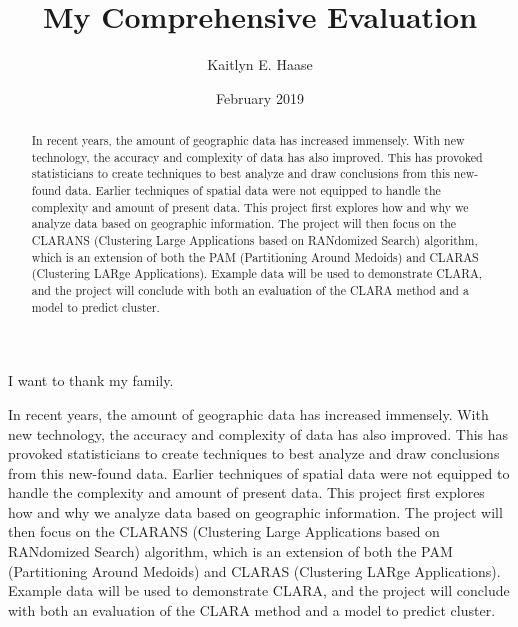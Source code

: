 \documentclass[12pt,twoside]{amherstthesis}
\title{My Comprehensive Evaluation}
\author{Kaitlyn E. Haase}
\date{February 2019}
\begin{document}
      \maketitle
  
  \frontmatter %
  \pagestyle{empty} %

      \begin{acknowledgements}
      I want to thank my family.
    \end{acknowledgements}
  
  

      \hypersetup{linkcolor=black}
    \setcounter{tocdepth}{2}
    \tableofcontents
  
      \listoftables
  
      \listoffigures
  
      \begin{abstract}
      In recent years, the amount of geographic data has increased immensely.
      With new technology, the accuracy and complexity of data has also
      improved. This has provoked statisticians to create techniques to best
      analyze and draw conclusions from this new-found data. Earlier
      techniques of spatial data were not equipped to handle the complexity
      and amount of present data. This project first explores how and why we
      analyze data based on geographic information. The project will then
      focus on the CLARANS (Clustering Large Applications based on RANdomized
      Search) algorithm, which is an extension of both the PAM (Partitioning
      Around Medoids) and CLARAS (Clustering LARge Applications). Example data
      will be used to demonstrate CLARA, and the project will conclude with
      both an evaluation of the CLARA method and a model to predict cluster.
    \end{abstract}
  
  
  \mainmatter %
  \pagestyle{fancyplain} %

  In recent years, the amount of geographic data has increased immensely.
  With new technology, the accuracy and complexity of data has also
  improved. This has provoked statisticians to create techniques to best
  analyze and draw conclusions from this new-found data. Earlier
  techniques of spatial data were not equipped to handle the complexity
  and amount of present data. This project first explores how and why we
  analyze data based on geographic information. The project will then
  focus on the CLARANS (Clustering Large Applications based on RANdomized
  Search) algorithm, which is an extension of both the PAM (Partitioning
  Around Medoids) and CLARAS (Clustering LARge Applications). Example data
  will be used to demonstrate CLARA, and the project will conclude with
  both an evaluation of the CLARA method and a model to predict cluster.
  
\end{document}
